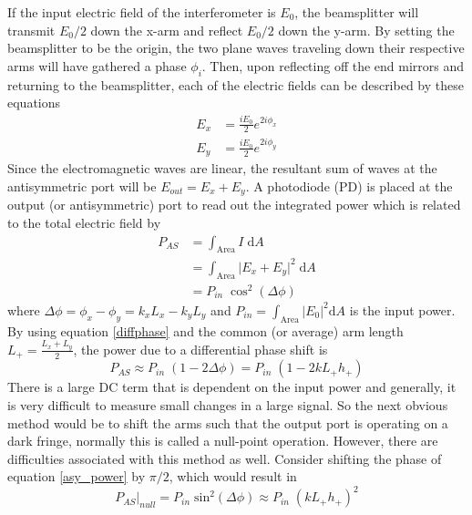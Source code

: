 		If the input electric field of the interferometer is $E_0$, the beamsplitter will transmit $E_0 /2$ down the x-arm and reflect $E_0 /2$ down the y-arm.  By setting the beamsplitter to be the origin, the two plane waves traveling down their respective arms will have gathered a phase $\phi_i$. Then, upon reflecting off the end mirrors and returning to the beamsplitter, each of the electric fields can be described by these equations
			\begin{equation}
			\begin{aligned}
				E_{x} 	&=	\frac{i E_0}{2} e^{2i\phi_{x}}	
			\\	E_{y} 	&=	\frac{i E_0}{2} e^{2i\phi_{y}}
			\end{aligned}
			\end{equation}
		Since the electromagnetic waves are linear, the resultant sum of waves at the antisymmetric port will be $E_{out} = E_x + E_y$. A photodiode (PD) is placed at the output (or antisymmetric) port to read out the integrated power which is related to the total electric field by
			\begin{equation}
			\begin{aligned}\label{asy_power}
				P_{AS}	&= \int_{\text{Area}} I \;				\text{d}A 
			\\			&= \int_{\text{Area}} \vert E_x + E_y \vert^2 \;	\text{d}A 
			\\			&= P_{in} \; \cos^2(\Delta \phi)
			\end{aligned}
			\end{equation}	
		where $\Delta \phi = \phi_{x} - \phi_{y} = k_x L_x - k_y L_y$ and $P_{in} = \int_{\text{Area}}	 \vert E_0\vert^2 \text{d}A$ is the input power. By using equation \ref{diffphase} and the common (or average) arm length $L_{+} = \frac{L_x + L_y}{2}$, the power due to a differential phase shift is
			\begin{equation}
			P_{AS} \approx P_{in} \; (1-2 \Delta \phi) = P_{in} \; (1-2 k L_{+} h_{+})
			\end{equation}
		There is a large DC term that is dependent on the input power and generally, it is very difficult to measure small changes in a large signal. So the next obvious method would be to shift the arms such that the output port is operating on a dark fringe, normally this is called a null-point operation.  However, there are difficulties associated with this method as well.  
		Consider shifting the phase of equation \ref{asy_power} by $\pi/2$, which would result in
			\begin{equation}\label{null}
			P_{AS} \vert_{null} = P_{in} \; \text{sin}^2 (\Delta \phi) \approx P_{in} \; (k L_{+} h_{+})^2 
			\end{equation}
